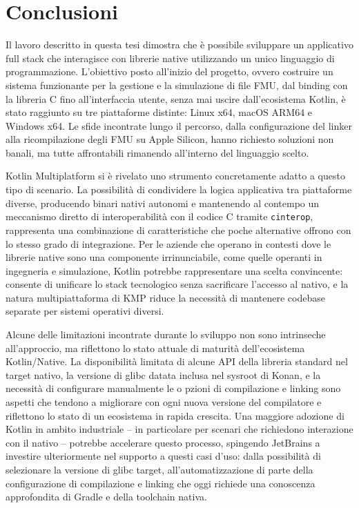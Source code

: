 \section{Conclusioni}
\label{sec:conclusioni-conclusioni}

Il lavoro descritto in questa tesi dimostra che è possibile sviluppare un applicativo full stack che interagisce con librerie native utilizzando un unico linguaggio di programmazione. L'obiettivo posto all'inizio del progetto, ovvero costruire un sistema funzionante per la gestione e la simulazione di file FMU, dal binding con la libreria C fino all'interfaccia utente, senza mai uscire dall'ecosistema Kotlin, è stato raggiunto su tre piattaforme distinte: Linux x64, macOS ARM64 e Windows x64. Le sfide incontrate lungo il percorso, dalla configurazione del linker alla ricompilazione degli FMU su Apple Silicon, hanno richiesto soluzioni non banali, ma tutte affrontabili rimanendo all'interno del linguaggio scelto.

Kotlin Multiplatform si è rivelato uno strumento concretamente adatto a questo tipo di scenario. La possibilità di condividere la logica applicativa tra piattaforme diverse, producendo binari nativi autonomi e mantenendo al contempo un meccanismo diretto di interoperabilità con il codice C tramite \texttt{cinterop}, rappresenta una combinazione di caratteristiche che poche alternative offrono con lo stesso grado di integrazione. Per le aziende che operano in contesti dove le librerie native sono una componente irrinunciabile, come quelle operanti in ingegneria e simulazione, Kotlin potrebbe rappresentare una scelta convincente: consente di unificare lo stack tecnologico senza sacrificare l'accesso al nativo, e la natura multipiattaforma di KMP riduce la necessità di mantenere codebase separate per sistemi operativi diversi.

Alcune delle limitazioni incontrate durante lo sviluppo non sono intrinseche all'approccio, ma riflettono lo stato attuale di maturità dell'ecosistema Kotlin/Na\-tive. La disponibilità limitata di alcune API della libreria standard nel target nativo, la versione di glibc datata inclusa nel sysroot di Konan, e la necessità di configurare manualmente le o pzioni di compilazione e linking sono aspetti che tendono a migliorare con ogni nuova versione del compilatore e riflettono lo stato di un ecosistema in rapida crescita. Una maggiore adozione di Kotlin in ambito industriale -- in particolare per scenari che richiedono interazione con il nativo -- potrebbe accelerare questo processo, spingendo JetBrains a investire ulteriormente nel supporto a questi casi d'uso: dalla possibilità di selezionare la versione di glibc target, all'automatizzazione di parte della configurazione di compilazione e linking che oggi richiede una conoscenza approfondita di Gradle e della toolchain nativa.

